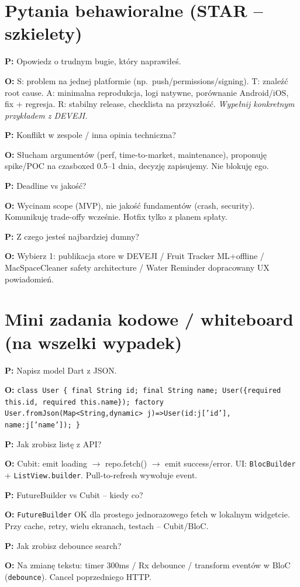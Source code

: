 \documentclass[11pt,a4paper]{article}
\newcommand{\pyt}[1]{\par\medskip\noindent\textbf{P:} #1\par}
\newcommand{\odp}[1]{\noindent\textbf{O:} #1\par}
\begin{document}
\section{Pytania behawioralne (STAR -- szkielety)}

\pyt{Opowiedz o trudnym bugie, który naprawiłeś.}
\odp{S: problem na jednej platformie (np.\ push/permissions/signing). T: znaleźć root cause. A: minimalna reprodukcja, logi natywne, porównanie Android/iOS, fix + regresja. R: stabilny release, checklista na przyszłość. \textit{Wypełnij konkretnym przykładem z DEVEJI.}}

\pyt{Konflikt w zespole / inna opinia techniczna?}
\odp{Słucham argumentów (perf, time-to-market, maintenance), proponuję spike/POC na czasboxed 0.5--1 dnia, decyzję zapisujemy. Nie blokuję ego.}

\pyt{Deadline vs jakość?}
\odp{Wycinam scope (MVP), nie jakość fundamentów (crash, security). Komunikuję trade-offy wcześnie. Hotfix tylko z planem spłaty.}

\pyt{Z czego jesteś najbardziej dumny?}
\odp{Wybierz 1: publikacja store w DEVEJI / Fruit Tracker ML+offline / MacSpaceCleaner safety architecture / Water Reminder dopracowany UX powiadomień.}

\section{Mini zadania kodowe / whiteboard (na wszelki wypadek)}

\pyt{Napisz model Dart z JSON.}
\odp{\texttt{class User \{ final String id; final String name; User(\{required this.id, required this.name\}); factory User.fromJson(Map<String,dynamic> j)=>User(id:j['id'], name:j['name']); \}}}

\pyt{Jak zrobisz listę z API?}
\odp{Cubit: emit loading $\to$ repo.fetch() $\to$ emit success/error. UI: \texttt{BlocBuilder} + \texttt{ListView.builder}. Pull-to-refresh wywołuje event.}

\pyt{FutureBuilder vs Cubit -- kiedy co?}
\odp{\texttt{FutureBuilder} OK dla prostego jednorazowego fetch w lokalnym widgetcie. Przy cache, retry, wielu ekranach, testach -- Cubit/BloC.}

\pyt{Jak zrobisz debounce search?}
\odp{Na zmianę tekstu: timer 300ms / Rx debounce / transform eventów w BloC (\texttt{debounce}). Cancel poprzedniego HTTP.}
\end{document}
